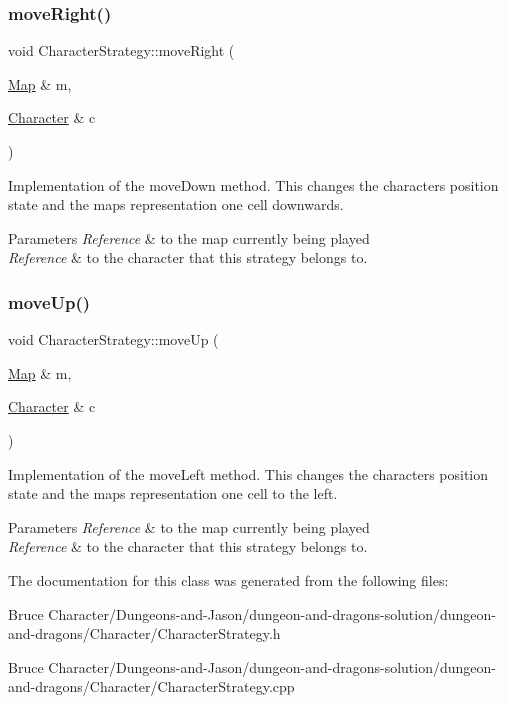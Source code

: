 \subsubsection{\texorpdfstring{move\+Right()}{moveRight()}}
{\footnotesize\ttfamily void Character\+Strategy\+::move\+Right (\begin{DoxyParamCaption}\item[{\hyperlink{class_map}{Map} \&}]{m,  }\item[{\hyperlink{class_character}{Character} \&}]{c }\end{DoxyParamCaption})}

Implementation of the move\+Down method. This changes the character\textquotesingle{}s position state and the map\textquotesingle{}s representation one cell downwards. 
\begin{DoxyParams}{Parameters}
{\em Reference} & to the map currently being played \\
\hline
{\em Reference} & to the character that this strategy belongs to. \\
\hline
\end{DoxyParams}
\hypertarget{class_character_strategy_a948e1af0959379f6df4b4abf5714bdcb}{}\label{class_character_strategy_a948e1af0959379f6df4b4abf5714bdcb} 
\subsubsection{\texorpdfstring{move\+Up()}{moveUp()}}
{\footnotesize\ttfamily void Character\+Strategy\+::move\+Up (\begin{DoxyParamCaption}\item[{\hyperlink{class_map}{Map} \&}]{m,  }\item[{\hyperlink{class_character}{Character} \&}]{c }\end{DoxyParamCaption})}

Implementation of the move\+Left method. This changes the character\textquotesingle{}s position state and the map\textquotesingle{}s representation one cell to the left. 
\begin{DoxyParams}{Parameters}
{\em Reference} & to the map currently being played \\
\hline
{\em Reference} & to the character that this strategy belongs to. \\
\hline
\end{DoxyParams}


The documentation for this class was generated from the following files\+:\begin{DoxyCompactItemize}
\item 
Bruce Character/\+Dungeons-\/and-\/\+Jason/dungeon-\/and-\/dragons-\/solution/dungeon-\/and-\/dragons/\+Character/Character\+Strategy.\+h\item 
Bruce Character/\+Dungeons-\/and-\/\+Jason/dungeon-\/and-\/dragons-\/solution/dungeon-\/and-\/dragons/\+Character/Character\+Strategy.\+cpp\end{DoxyCompactItemize}
